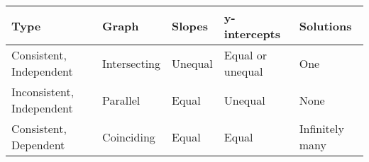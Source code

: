 \vspace*{1ex} 

\noindent \begin{tabularx}{\textwidth}{*{5}{Y}}
\hline
\textbf{Type} & \textbf{Graph} & \textbf{Slopes} & \textbf{y-intercepts} & \textbf{Solutions} \\
\hline 
Consistent, Independent & Intersecting & Unequal & Equal or unequal & One \\
\hline 
Inconsistent, Independent & Parallel  & Equal & Unequal & None \\
\hline 
Consistent, Dependent & Coinciding & Equal & Equal & Infinitely many \\
\hline 
\end{tabularx}  


